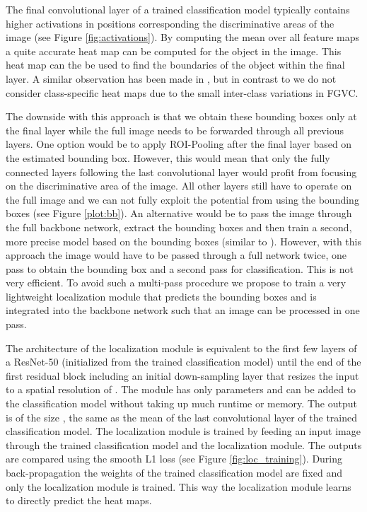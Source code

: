 \documentclass[10pt,twocolumn,letterpaper]{article}
\begin{document}
The final convolutional layer of a trained classification model typically contains higher activations in positions corresponding the discriminative areas of the image (see Figure \ref{fig:activations}). By computing the mean over all feature maps a quite accurate heat map can be computed for the object in the image. This heat map can the be used to find the boundaries of the object within the final layer. A similar observation has been made in \cite{zhou2016learning}, but in contrast to \cite{zhou2016learning} we do not consider class-specific heat maps due to the small inter-class variations in FGVC. 

The downside with this approach is that we obtain these bounding boxes only at the final layer while the full image needs to be forwarded through all previous layers. One option would be to apply ROI-Pooling after the final layer based on the estimated bounding box. However, this would mean that only the fully connected layers following the last convolutional layer would profit from focusing on the discriminative area of the image. All other layers still have to operate on the full image and we can not fully exploit the potential from using the bounding boxes (see Figure \ref{plot:bb}). An alternative would be to pass the image through the full backbone network, extract the bounding boxes and then train a second, more precise model based on the bounding boxes (similar to \cite{simonelli2018increasingly}). However, with this approach the image would have to be passed through a full network twice, one pass to obtain the bounding box and a second pass for classification. This is not very efficient. To avoid such a multi-pass procedure we propose to train a very lightweight localization module that predicts the bounding boxes and is integrated into the backbone network such that an image can be processed in one pass.

The architecture of the localization module is equivalent to the first few layers of a ResNet-50 (initialized from the trained classification model) until the end of the first residual block including an initial down-sampling layer that resizes the input to a spatial resolution of . The module has only  parameters and can be added to the classification model without taking up much runtime or memory. The output is of the size , the same as the mean of the last convolutional layer of the trained classification model. The localization module is trained by feeding an input image through the trained classification model and the localization module. The outputs are compared using the smooth L1 loss \cite{girshick2015fast} (see Figure \ref{fig:loc_training}). During back-propagation the weights of the trained classification model are fixed and only the localization module is trained. This way the localization module learns to directly predict the heat maps.
\end{document}
